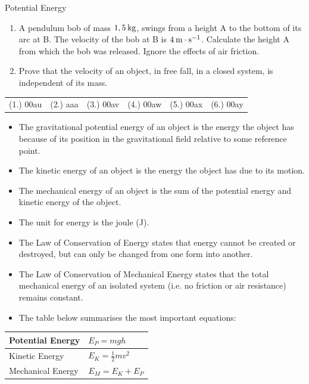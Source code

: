 \begin{exercises}{Potential Energy }
\begin{enumerate}[noitemsep, label=\textbf{\arabic*}. ]
\item A pendulum bob of mass $1,5\phantom{\rule{2pt}{0ex}}\text{kg}$, swings from a height A to the bottom of its arc at B. The velocity of the bob at B is $4\phantom{\rule{2pt}{0ex}}\text{m}\ensuremath{\cdot}\text{s}{}^{-1}$. Calculate the height A from which the bob was released. Ignore the effects of air friction.\newline
\item Prove that the velocity of an object, in free fall, in a closed system, is independent of its mass.\newline
\end{enumerate}
\par \practiceinfo
\par \begin{tabular}[h]{cccccc}
(1.) 00au  & (2.) aaa & (3.) 00av  &  (4.) 00aw  &  (5.) 00ax  &  (6.) 00ay \end{tabular}
\end{exercises}
\clearpage
{}
            \nopagebreak
      \label{m38786*id70947}\begin{itemize}[noitemsep]
\item The gravitational potential energy of an object is the energy the object has because of its position in the gravitational field relative to some reference point.
\item The kinetic energy of an object is the energy the object has due to its motion.
\item The mechanical energy of an object is the sum of the potential energy and kinetic energy of the object.
\item The unit for energy is the joule (J).
\item The Law of Conservation of Energy states that energy cannot be created or destroyed, but can only be changed from one form into another.
\item The Law of Conservation of Mechanical Energy states that the total mechanical energy of an isolated system (i.e. no friction or air resistance) remains constant.
\item The table below summarises the most important equations:
\end{itemize}
          \begin{table}[H]
        \begin{center}
      \label{m38786*id71092}
    \noindent
      \begin{tabular}{|l|l|}\hline
        Potential Energy &
                ${E}_{P}=mgh$
             \\ \hline
        Kinetic Energy &
                ${E}_{K}=\frac{1}{2}m{v}^{2}$
              \\ \hline
        Mechanical Energy &
                ${E}_{M}={E}_{K}+{E}_{P}$
            \\ \hline
    \end{tabular}
      \end{center}
\end{table}
